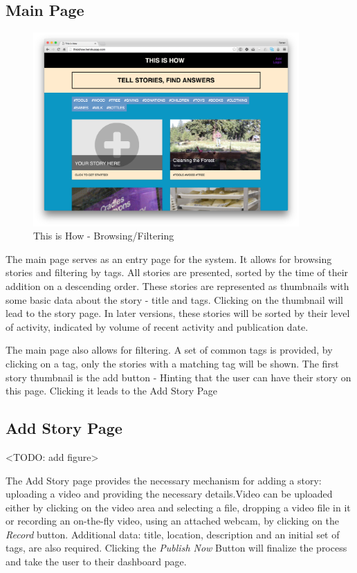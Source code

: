 \subsection{Main Page}

   \begin{figure}[thpb]
      \centering
      \includegraphics[width=4in]{figures/mainpage.png}
      \caption{This is How - Browsing/Filtering}
      \label{fig_main_page}
   \end{figure}

The main page serves as an entry page for the system. It allows for browsing stories and filtering by tags. All stories are presented, sorted by the time of their addition on a descending order. These stories are represented as thumbnails with some basic data about the story - title and tags. Clicking on the thumbnail will lead to the story page. In later versions, these stories will be sorted by their level of activity, indicated by volume of recent activity and publication date. 

The main page also allows for filtering. A set of common tags is provided, by clicking on a tag, only the stories with a matching tag will be shown. The first story thumbnail is the add button - Hinting that the user can have their story on this page. Clicking it leads to the Add Story Page

\subsection{Add Story Page}

<TODO: add figure>

The Add Story page provides the necessary mechanism for adding a story: uploading a video and providing the necessary details.Video can be uploaded either by clicking on the video area and selecting a file, dropping a video file in it or recording an on-the-fly video, using an attached webcam, by clicking on the \textit{Record} button. Additional data: title, location, description and an initial set of tags, are also required. Clicking the \textit{Publish Now} Button will finalize the process and take the user to their dashboard page. 

